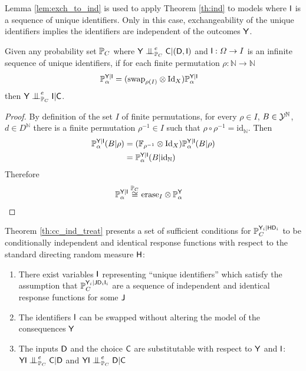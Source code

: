 Lemma \ref{lem:exch_to_ind} is used to apply Theorem \ref{th:ind} to models where $\mathsf{I}$ is a sequence of unique identifiers. Only in this case, exchangeability of the unique identifiers implies the identifiers are independent of the outcomes $\mathsf{Y}$.

\begin{lemma}\label{lem:exch_to_ind}
Given any probability set $\mathbb{P}_C$ where $\RV{Y}\CI_{\prob{P}_C}^e \RV{C}|(\RV{D},\RV{I})$ and $\mathsf{I}:\Omega\to I$ is an infinite sequence of unique identifiers, if for each finite permutation $\rho:\mathbb{N}\to \mathbb{N}$
\begin{align}
    \mathbb{P}_\alpha^{\mathsf{Y}|\mathsf{I}} &= (\text{swap}_{\rho(I)}\otimes \text{Id}_X )\mathbb{P}_\alpha^{\mathsf{Y}|\mathsf{I}}
\end{align}
then $\RV{Y}\CI_{\prob{P}_C}^e \RV{I}|\RV{C}$.
\end{lemma}

\begin{proof}
By definition of the set $I$ of finite permutations, for every $\rho\in I$, $B\in\mathcal{Y}^{\mathbb{N}}$, $d\in D^{\mathbb{N}}$ there is a finite permutation $\rho^{-1}\in I$ such that $\rho\circ\rho^{-1}=\text{id}_{\mathbb{N}}$. Then
\begin{align}
    \mathbb{P}_\alpha^{\mathsf{Y}|\mathsf{I}}(B|\rho) &= (\mathbb{F}_{\rho^{-1}}\otimes \text{Id}_X )\mathbb{P}_\alpha^{\mathsf{Y}|\mathsf{I}}(B|\rho)\\
    &= \mathbb{P}_\alpha^{\mathsf{Y}|\mathsf{I}}(B|\text{id}_{\mathbb{N}})
\end{align}
Therefore
\begin{align}
    \mathbb{P}_\alpha^{\mathsf{Y}|\mathsf{I}} &\overset{\mathbb{P}_C}{\cong} \text{erase}_{I}\otimes \mathbb{P}_\alpha^{\mathsf{Y}}
\end{align}
\end{proof}

Theorem \ref{th:cc_ind_treat} presents a set of sufficient conditions for $\mathbb{P}_C^{\mathsf{Y}_i|\mathsf{H}\mathsf{D}_i}$ to be conditionally independent and identical response functions with respect to the standard directing random measure $\mathsf{H}$:
\begin{enumerate}
    \item There exist variables $\mathsf{I}$ representing ``unique identifiers'' which satisfy the assumption that $\mathbb{P}_C^{\mathsf{Y}_i|\mathsf{J}\mathsf{D}_i\mathsf{I}_i}$ are a sequence of independent and identical response functions for some $\mathsf{J}$
    \item The identifiers $\mathsf{I}$ can be swapped without altering the model of the consequences $\mathsf{Y}$
    \item The inputs $\mathsf{D}$ and the choice $\mathsf{C}$ are substitutable with respect to $\mathsf{Y}$ and $\mathsf{I}$: $\RV{YI}\CI^e_{\prob{P}_C} \RV{C}|\RV{D}$ and $\RV{YI}\CI^e_{\prob{P}_C} \RV{D}|\RV{C}$
\end{enumerate}

